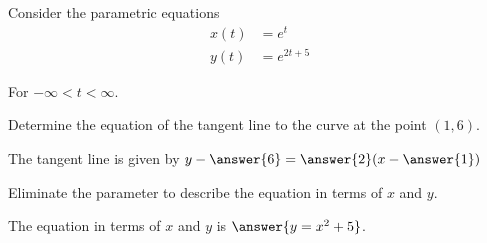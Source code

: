 \documentclass{ximera}
\author{Jason Miller}
\begin{document}
\begin{exercise}
Consider the parametric equations 
\begin{align*}
x(t) &= e^t\\
y(t) &= e^{2t+5}
\end{align*}

For $-\infty < t < \infty$.

Determine the equation of the tangent line to the curve at the point $(1,6)$. 

The tangent line is given by $y-\answer{6}=\answer{ 2 }(x-\answer{1})$

\begin{exercise}

Eliminate the parameter to describe the equation in terms of $x$ and $y$. 

The equation in terms of $x$ and $y$ is $\answer{  y=x^2+5}$.


\end{exercise}
\end{exercise}
\end{document}
